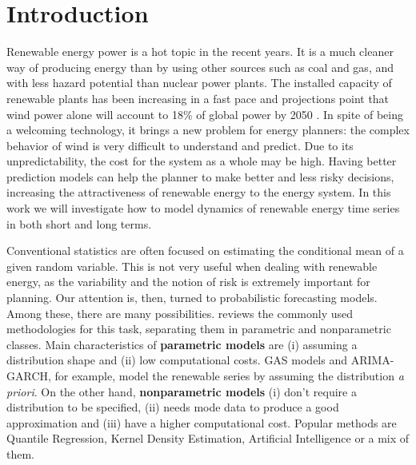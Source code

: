 \section{Introduction}


Renewable energy power is a hot topic in the recent years. It is a much cleaner way of producing energy than by using other sources such as coal and gas, and with less hazard potential than nuclear power plants. The installed capacity of renewable plants has been increasing in a fast pace and projections point that wind power alone will account to 18\% of global power by 2050  \cite{IntEnerAgency}.
In spite of being a welcoming technology, it brings a new problem for energy planners: 
 the complex behavior of wind is very difficult to understand and predict. Due to its unpredictability, the cost for the system as a whole may be high. 
Having better prediction models can help the planner to make better and less risky decisions, increasing the attractiveness of renewable energy to the energy system. 
In this work we will investigate how to model dynamics of renewable energy time series in both short and long terms.


Conventional statistics are often focused on estimating the conditional mean of a given random variable. This is not very useful when dealing with renewable energy, as the variability and the notion of risk is extremely important for planning. Our attention is, then, turned to probabilistic forecasting models. Among these, there are many possibilities. \cite{zhang_review_2014} reviews the commonly used methodologies for this task, separating them in parametric and nonparametric classes. Main characteristics of \textbf{parametric models} are (i) assuming a distribution shape and (ii) low computational costs. GAS models \cite{creal2013generalized} and ARIMA-GARCH, for example, model the renewable series by assuming the distribution \textit{a priori}. On the other hand, \textbf{nonparametric models} (i) don't require a distribution to be specified, (ii) needs mode data to produce a good approximation and (iii) have a higher computational cost. Popular methods are Quantile Regression, Kernel Density Estimation,  Artificial Intelligence or a mix of them.



